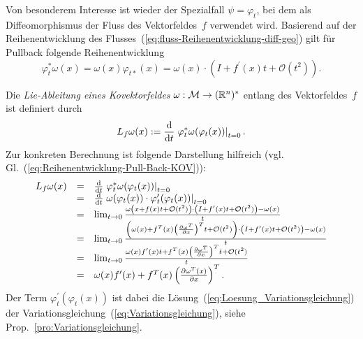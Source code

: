Von besonderem Interesse ist wieder der Spezialfall $\psi=\varphi_{t}$,
bei dem als Diffeomorphismus der Fluss des Vektorfeldes~$f$ verwendet
wird. Basierend auf der Reihenentwicklung des Flusses~(\ref{eq:fluss-Reihenentwicklung-diff-geo})
gilt für Pullback folgende Reihenentwicklung 
\begin{equation}
\varphi_{t}^{*}\omega(x)=\omega(x)\varphi_{t*}(x)=\omega(x)\cdot\left(I+f^{\prime}(x)t+\mathcal{O}(t^{2})\right).\label{eq:Reihenentwicklung-Pull-Back-KOV}
\end{equation}

Die \emph{Lie-Ableitung eines Kovektorfeldes}
$\omega:\mathcal{M}\to({\mathbb{R}}^{n})^{*}$ entlang des Vektorfeldes~$f$
ist definiert durch 
\begin{equation}
L_{f}\omega(x):=\frac{{\mathrm{d}}}{{\mathrm{d}} t}\left.\varphi_{t}^{*}\omega(\varphi_{t}(x))\right|_{t=0}.\label{eq:Lie-Ableitung-Kovektorfeld}
\end{equation}
Zur konkreten Berechnung ist folgende Darstellung hilfreich (vgl.
Gl.~(\ref{eq:Reihenentwicklung-Pull-Back-KOV})): 
\begin{equation}
\begin{array}{ccl}
L_{f}\omega(x) & = & \frac{{\mathrm{d}}}{{\mathrm{d}} t}\left.\varphi_{t}^{*}\omega(\varphi_{t}(x))\right|_{t=0}\\
 & = & \frac{{\mathrm{d}}}{{\mathrm{d}} t}\left.\omega(\varphi_{t}(x))\cdot\varphi_{t}^{\prime}(\varphi_{t}(x))\right|_{t=0}\\
 & = & \lim_{t\to0}\frac{\omega\left(x+f(x)t+\mathcal{O}(t^{2})\right)\cdot\left(I+f^{\prime}(x)t+\mathcal{O}(t^{2})\right)-\omega(x)}{t}\\
 & = & \lim_{t\to0}\frac{\left(\omega(x)+f^{T}(x)\left(\frac{\partial\omega^{T}}{\partial x}\right)^{T}t+\mathcal{O}(t^{2})\right)\cdot\left(I+f^{\prime}(x)t+\mathcal{O}(t^{2})\right)-\omega(x)}{t}\\
 & = & \lim_{t\to0}\frac{\omega(x)f^{\prime}(x)t+f^{T}(x)\left(\frac{\partial\omega^{T}}{\partial x}\right)^{T}t+\mathcal{O}(t^{2})}{t}\\
 & = & \omega(x)f^{\prime}(x)+f^{T}(x)\left(\frac{\partial\omega^{T}(x)}{\partial x}\right)^{T}.
\end{array}\label{eq:Lie-Kovektor-Berechnung}
\end{equation}
Der Term $\varphi_{t}^{\prime}(\varphi_{t}(x))$ ist dabei die Lösung~(\ref{eq:Loesung_Variationsgleichung})
der Variationsgleichung~(\ref{eq:Variationsgleichung}), siehe Prop.~\ref{pro:Variationsgleichung}.

